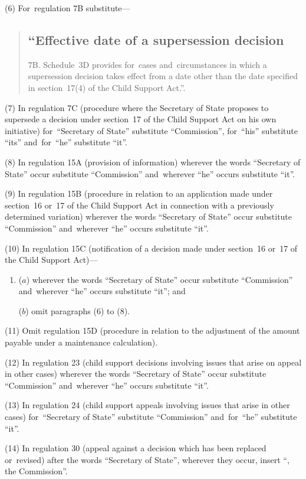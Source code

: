\documentclass[12pt,a4paper]{article}
\begin{document}
(6) For~regulation 7B substitute—
\begin{quotation}
\subsection*{“Effective date of a supersession decision}

7B.  Schedule~3D provides for~cases and~circumstances in which a supersession decision takes effect from a date other than the date specified in section~17(4) of the Child Support   Act.”.
\end{quotation}

(7) In regulation 7C (procedure where the Secretary of State proposes to supersede a decision under section~17 of the Child Support Act on his own initiative) for~“Secretary of State” substitute “Commission”, for~“his” substitute “its” and~for~“he” substitute “it”.

(8) In regulation 15A (provision of information) wherever the words “Secretary of State” occur substitute “Commission” and~wherever “he” occurs substitute “it”.

(9) In regulation 15B (procedure in relation to an application made under section~16 or~17 of the Child Support Act in connection with a previously determined variation) wherever the words “Secretary of State” occur substitute “Commission” and~wherever “he” occurs substitute “it”.

(10) In regulation 15C (notification of a decision made under section~16 or~17 of the Child Support Act)—
\begin{enumerate}\item[]
($a$) wherever the words “Secretary of State” occur substitute “Commission” and~wherever “he” occurs substitute “it”; and

($b$) omit paragraphs (6) to (8).
\end{enumerate}

(11) Omit regulation 15D (procedure in relation to the adjustment of the amount payable under a maintenance calculation).

(12) In regulation 23 (child support decisions involving issues that arise on appeal in other cases) wherever the words “Secretary of State” occur substitute “Commission” and~wherever “he” occurs substitute “it”.

(13) In regulation 24 (child support appeals involving issues that arise in other cases) for~“Secretary of State” substitute “Commission” and~for~“he” substitute “it”.

(14) In regulation 30 (appeal against a decision which has been replaced or~revised) after the words “Secretary of State”, wherever they occur, insert “, the Commission”.
\end{document}
